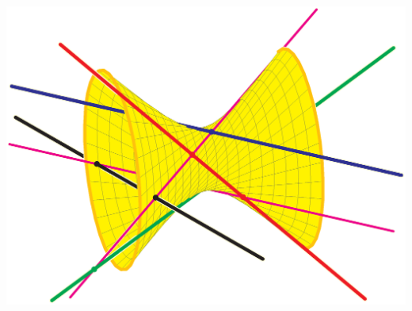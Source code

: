 \documentclass[12pt]{article}
\begin{document}
\includegraphics[width=6in]{4lines.eps}
\end{document}
